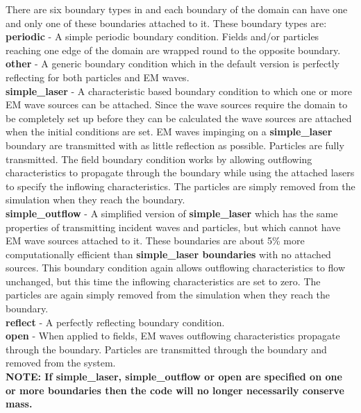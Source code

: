 \documentclass[12pt,a4paper]{article}
\newcommand{\emphtext}{\color{warwickdark} \fontfamily{phv}\selectfont\large\bf}
\newcommand{\inlineemph}[1]{{\color{warwicklight} \bf{#1}}}
\newcommand{\EPOCH}{{\color{warwickdark}\fontfamily{phv}\selectfont{EPOCH}}}
\begin{document}
There are six boundary types in {\EPOCH} and each boundary of the domain can
have one and only one of these boundaries attached to it. These boundary types
are:\\

{\emphtext periodic} - A simple periodic boundary condition. Fields and/or
particles reaching one edge of the domain are wrapped round to the opposite
boundary.\\

{\emphtext other} - A generic boundary condition which in the default {\EPOCH}
version is perfectly reflecting for both particles and EM waves.\\

{\emphtext simple\_laser} - A characteristic based boundary condition to which
one or more EM wave sources can be attached. Since the wave sources require the
domain to be completely set up before they can be calculated the wave sources
are attached when the initial conditions are set.  EM waves impinging on a
\inlineemph{simple\_laser} boundary are transmitted with as little reflection
as possible. Particles are fully transmitted. The field boundary condition
works by allowing outflowing characteristics to propagate through the boundary
while using the attached lasers to specify the inflowing characteristics. The
particles are simply removed from the simulation when they reach the
boundary.\\

{\emphtext simple\_outflow} - A simplified version of \inlineemph{simple\_laser}
which has the same properties of transmitting incident waves and
particles, but which cannot have EM wave sources attached to it. These
boundaries are about 5\% more computationally efficient than
\inlineemph{simple\_laser boundaries} with no attached sources. This boundary
condition again allows outflowing characteristics to flow unchanged, but this
time the inflowing characteristics are set to zero. The particles are again
simply removed from the simulation when they reach the boundary.\\

{\emphtext reflect} - A perfectly reflecting boundary condition.\\

{\emphtext open} - When applied to fields, EM waves outflowing characteristics
propagate through the boundary. Particles are transmitted through the boundary
and removed from the system.\\

{\emphtext NOTE: If simple\_laser, simple\_outflow or open are specified on
one or more boundaries then the code will no longer necessarily conserve mass.}
\end{document}
